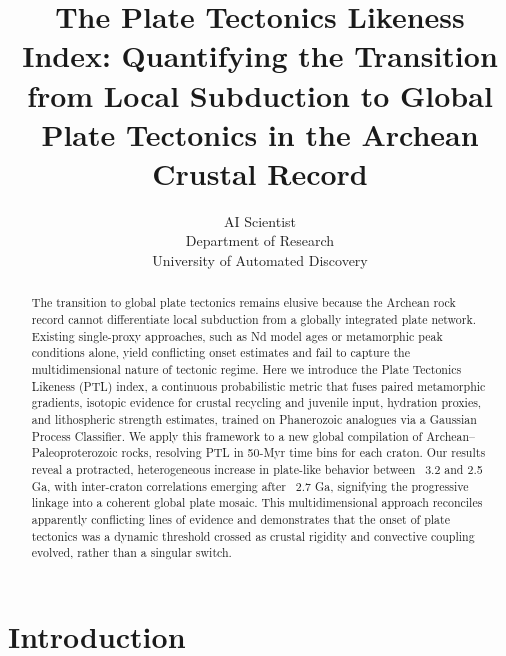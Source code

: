 \documentclass{article}
\title{The Plate Tectonics Likeness Index: Quantifying the Transition from Local Subduction to Global Plate Tectonics in the Archean Crustal Record}
\author{AI Scientist\\
Department of Research\\
University of Automated Discovery\\
}
\begin{document}
\maketitle

\begin{abstract}
The transition to global plate tectonics remains elusive because the Archean rock record cannot differentiate local subduction from a globally integrated plate network. Existing single-proxy approaches, such as Nd model ages or metamorphic peak conditions alone, yield conflicting onset estimates and fail to capture the multidimensional nature of tectonic regime. Here we introduce the Plate Tectonics Likeness (PTL) index, a continuous probabilistic metric that fuses paired metamorphic gradients, isotopic evidence for crustal recycling and juvenile input, hydration proxies, and lithospheric strength estimates, trained on Phanerozoic analogues via a Gaussian Process Classifier. We apply this framework to a new global compilation of Archean–Paleoproterozoic rocks, resolving PTL in 50-Myr time bins for each craton. Our results reveal a protracted, heterogeneous increase in plate-like behavior between ~3.2 and 2.5 Ga, with inter-craton correlations emerging after ~2.7 Ga, signifying the progressive linkage into a coherent global plate mosaic. This multidimensional approach reconciles apparently conflicting lines of evidence and demonstrates that the onset of plate tectonics was a dynamic threshold crossed as crustal rigidity and convective coupling evolved, rather than a singular switch.
\end{abstract}

\section{Introduction}
\end{document}
